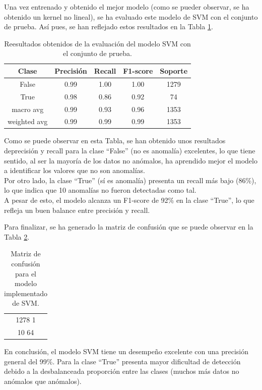 \documentclass[12pt,letterpaper]{article}
\begin{document}
Una vez entrenado y obtenido el mejor modelo (como se pueder observar, se ha obtenido un kernel no lineal), se ha evaluado este modelo de SVM con el conjunto de prueba. Así pues, se han reflejado estos resultados en la Tabla \ref{tab:res-SVM}.
\begin{table}[H]
    \centering
    \begin{tabular}{|c|c|c|c|c|}
    \hline
    Clase & Precisión & Recall & F1-score & Soporte \\ \hline \hline
    False & 0.99 & 1.00 & 1.00 & 1279 \\ \hline
    True & 0.98 &  0.86 & 0.92 & 74 \\ \hline
    macro avg & 0.99 & 0.93 & 0.96 & 1353 \\ \hline
    weighted avg & 0.99 &  0.99 & 0.99 & 1353 \\ \hline
    \end{tabular}
    \caption{Reesultados obtenidos de la evaluación del modelo SVM con el conjunto de prueba.}
    \label{tab:res-SVM}
\end{table}

Como se puede observar en esta Tabla, se han obtenido unos resultados deprecisión y recall para la clase ``False'' (no es anomalía) excelentes, lo que tiene sentido, al ser la mayoría de los datos no anómalos, ha aprendido mejor el modelo a identificar los valores que no son anomalías.\\
Por otro lado, la clase ``True'' (sí es anomalía) presenta un recall más bajo (86\%), lo que indica que 10 anomalías no fueron detectadas como tal.\\
A pesar de esto, el modelo alcanza un F1-score de 92\% en la clase ``True'', lo que refleja un buen balance entre precisión y recall.

Para finalizar, se ha generado la matriz de confusión que se puede observar en la Tabla \ref{tab:confusion-SVM}.
\begin{table}[H]
    \centering
    \begin{tabular}{|c|}
    \hline
    1278 \hspace{8mm} 1 \\ 
    10 \hspace{10mm} 64 \\ \hline
    \end{tabular}
    \caption{Matriz de confusión para el modelo implementado de SVM.}
    \label{tab:confusion-SVM}
\end{table}

En conclusión, el modelo SVM tiene un desempeño excelente con una precisión general del 99\%. Para la clase ``True'' presenta mayor dificultad de detección debido a la desbalanceada proporción entre las clases (muchos más datos no anómalos que anómalos).
\end{document}
